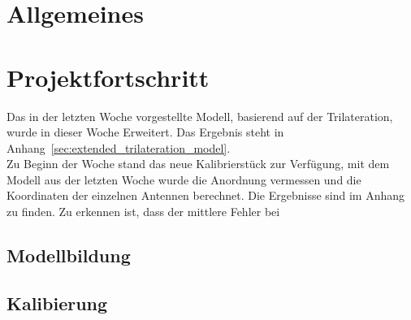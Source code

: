 \documentclass[a4paper,10pt,fleqn]{article}
\begin{document}
\setlength{\headheight}{36pt}

\begin{titlepage}



\end{titlepage}

\section[Allgemeines]{Allgemeines}

\section[Fortschritt]{Projektfortschritt}
Das in der letzten Woche vorgestellte Modell, basierend auf der Trilateration, wurde in dieser Woche Erweitert. Das Ergebnis steht in Anhang~\ref{sec:extended_trilateration_model}.\\
Zu Beginn der Woche stand das neue Kalibrierstück zur Verfügung, mit dem Modell aus der letzten Woche wurde die Anordnung vermessen und die Koordinaten der einzelnen Antennen berechnet. Die Ergebnisse sind im Anhang~{} zu finden. Zu erkennen ist, dass der mittlere Fehler bei

\subsection{Modellbildung}
\subsection{Kalibierung}
\end{document}
